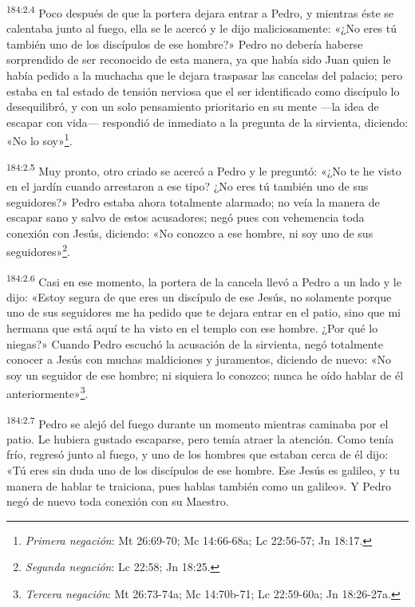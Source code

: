 \par 
\textsuperscript{184:2.4} Poco después de que la portera dejara entrar a Pedro, y mientras éste se calentaba junto al fuego, ella se le acercó y le dijo maliciosamente: «¿No eres tú también uno de los discípulos de ese hombre?» Pedro no debería haberse sorprendido de ser reconocido de esta manera, ya que había sido Juan quien le había pedido a la muchacha que le dejara traspasar las cancelas del palacio; pero estaba en tal estado de tensión nerviosa que el ser identificado como discípulo lo desequilibró, y con un solo pensamiento prioritario en su mente ---la idea de escapar con vida--- respondió de inmediato a la pregunta de la sirvienta, diciendo: «No lo soy»\footnote{\textit{Primera negación}: Mt 26:69-70; Mc 14:66-68a; Lc 22:56-57; Jn 18:17.}.

\par 
\textsuperscript{184:2.5} Muy pronto, otro criado se acercó a Pedro y le preguntó: «¿No te he visto en el jardín cuando arrestaron a ese tipo? ¿No eres tú también uno de sus seguidores?» Pedro estaba ahora totalmente alarmado; no veía la manera de escapar sano y salvo de estos acusadores; negó pues con vehemencia toda conexión con Jesús, diciendo: «No conozco a ese hombre, ni soy uno de sus seguidores»\footnote{\textit{Segunda negación}: Lc 22:58; Jn 18:25.}.

\par 
\textsuperscript{184:2.6} Casi en ese momento, la portera de la cancela llevó a Pedro a un lado y le dijo: «Estoy segura de que eres un discípulo de ese Jesús, no solamente porque uno de sus seguidores me ha pedido que te dejara entrar en el patio, sino que mi hermana que está aquí te ha visto en el templo con ese hombre. ¿Por qué lo niegas?» Cuando Pedro escuchó la acusación de la sirvienta, negó totalmente conocer a Jesús con muchas maldiciones y juramentos, diciendo de nuevo: «No soy un seguidor de ese hombre; ni siquiera lo conozco; nunca he oído hablar de él anteriormente»\footnote{\textit{Tercera negación}: Mt 26:73-74a; Mc 14:70b-71; Lc 22:59-60a; Jn 18:26-27a.}.

\par 
\textsuperscript{184:2.7} Pedro se alejó del fuego durante un momento mientras caminaba por el patio. Le hubiera gustado escaparse, pero temía atraer la atención. Como tenía frío, regresó junto al fuego, y uno de los hombres que estaban cerca de él dijo: «Tú eres sin duda uno de los discípulos de ese hombre. Ese Jesús es galileo, y tu manera de hablar te traiciona, pues hablas también como un galileo». Y Pedro negó de nuevo toda conexión con su Maestro.


